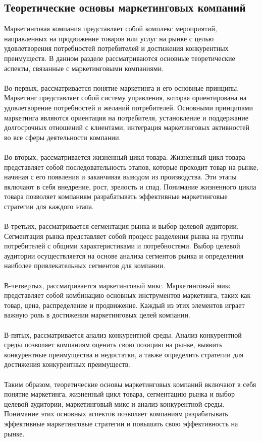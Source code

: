 \documentclass{article}
\begin{document}
\subsection{Теоретические основы маркетинговых компаний}
Маркетинговая компания представляет собой комплекс мероприятий, направленных на продвижение товаров или услуг на рынке с целью удовлетворения потребностей потребителей и достижения конкурентных преимуществ. В данном разделе рассматриваются основные теоретические аспекты, связанные с маркетинговыми компаниями.\\
~\\
Во-первых, рассматривается понятие маркетинга и его основные принципы. Маркетинг представляет собой систему управления, которая ориентирована на удовлетворение потребностей и желаний потребителей. Основными принципами маркетинга являются ориентация на потребителя, установление и поддержание долгосрочных отношений с клиентами, интеграция маркетинговых активностей во все сферы деятельности компании.\\
~\\
Во-вторых, рассматривается жизненный цикл товара. Жизненный цикл товара представляет собой последовательность этапов, которые проходит товар на рынке, начиная с его появления и заканчивая выводом из производства. Эти этапы включают в себя внедрение, рост, зрелость и спад. Понимание жизненного цикла товара позволяет компаниям разрабатывать эффективные маркетинговые стратегии для каждого этапа.\\
~\\
В-третьих, рассматривается сегментация рынка и выбор целевой аудитории. Сегментация рынка представляет собой процесс разделения рынка на группы потребителей с общими характеристиками и потребностями. Выбор целевой аудитории осуществляется на основе анализа сегментов рынка и определения наиболее привлекательных сегментов для компании.\\
~\\
В-четвертых, рассматривается маркетинговый микс. Маркетинговый микс представляет собой комбинацию основных инструментов маркетинга, таких как товар, цена, распределение и продвижение. Каждый из этих элементов играет важную роль в достижении маркетинговых целей компании.\\
~\\
В-пятых, рассматривается анализ конкурентной среды. Анализ конкурентной среды позволяет компаниям оценить свою позицию на рынке, выявить конкурентные преимущества и недостатки, а также определить стратегии для достижения конкурентных преимуществ.\\
~\\
Таким образом, теоретические основы маркетинговых компаний включают в себя понятие маркетинга, жизненный цикл товара, сегментацию рынка и выбор целевой аудитории, маркетинговый микс и анализ конкурентной среды. Понимание этих основных аспектов позволяет компаниям разрабатывать эффективные маркетинговые стратегии и повышать свою эффективность на рынке.
\end{document}

